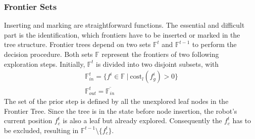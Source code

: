 \documentclass[twocolumn]{svjour3}[2016]
\begin{document}
\subsubsection{Frontier Sets}
Inserting and marking are straightforward functions. The essential and difficult part is the identification, which frontiers have to be inserted or marked in the tree structure. Frontier trees depend on two sets $\mathbb{F}^{t}$ and $\mathbb{F}^{t-1}$ to perform the decision procedure. Both sets $\mathbb{F}$ represent the frontiers of two following exploration steps. Initially, $\mathbb{F}^{t}$ is divided into two disjoint subsets, with
\begin{align}
&\mathbb{F}^t_{in} = \{ f^i \in \mathbb{F}\ |\ \textrm{cost}_l(f^i_g) > 0 \}\\
&\mathbb{F}^t_{out} = \overline{\mathbb{F}_{in}}
\end{align}
The set of the prior step is defined by all the unexplored leaf nodes in the Frontier Tree. Since the tree is in the state before node insertion, the robot's current position $f^t_c$ is also a leaf but already explored. Consequently the $f^t_c$ has to be excluded, resulting in $\mathbb{F}^{t-1}\text{\textbackslash}\{f^t_c\}$.
\end{document}
